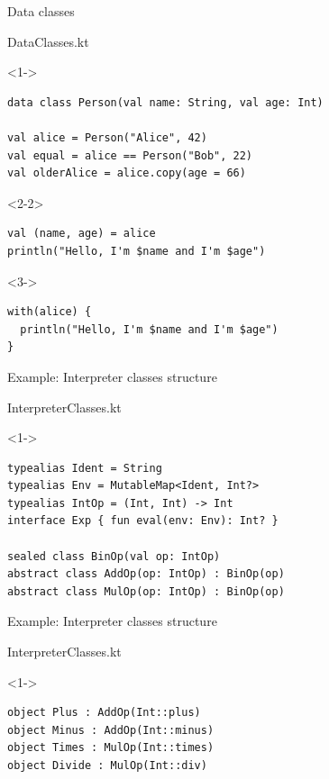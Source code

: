 \documentclass[hyperref={pdfpagelabels=false},xcolor={dvipsnames},compress]{beamer}
\begin{document}
    \begin{frame}[fragile]{Data classes}
        \begin{exampleblock}{DataClasses.kt}
            \begin{onlyenv}<1->
                \begin{lstlisting}
data class Person(val name: String, val age: Int)

val alice = Person("Alice", 42)
val equal = alice == Person("Bob", 22)
val olderAlice = alice.copy(age = 66)
                \end{lstlisting}
            \end{onlyenv}
            \begin{onlyenv}<2-2>
                \begin{lstlisting}
val (name, age) = alice
println("Hello, I'm $name and I'm $age")
                \end{lstlisting}
            \end{onlyenv}
            \begin{onlyenv}<3->
                \begin{lstlisting}
with(alice) {
  println("Hello, I'm $name and I'm $age")
}
                \end{lstlisting}
            \end{onlyenv}
        \end{exampleblock}
    \end{frame}

    \begin{frame}[fragile]{Example: Interpreter classes structure}
        \begin{exampleblock}{InterpreterClasses.kt}
            \begin{onlyenv}<1->
                \begin{lstlisting}
typealias Ident = String
typealias Env = MutableMap<Ident, Int?>
typealias IntOp = (Int, Int) -> Int
interface Exp { fun eval(env: Env): Int? }

sealed class BinOp(val op: IntOp)
abstract class AddOp(op: IntOp) : BinOp(op)
abstract class MulOp(op: IntOp) : BinOp(op)
                \end{lstlisting}
            \end{onlyenv}
        \end{exampleblock}
    \end{frame}

    \begin{frame}[fragile]{Example: Interpreter classes structure}
        \begin{exampleblock}{InterpreterClasses.kt}
            \begin{onlyenv}<1->
                \begin{lstlisting}
object Plus : AddOp(Int::plus)
object Minus : AddOp(Int::minus)
object Times : MulOp(Int::times)
object Divide : MulOp(Int::div)
                \end{lstlisting}
            \end{onlyenv}
        \end{exampleblock}
    \end{frame}
\end{document}
